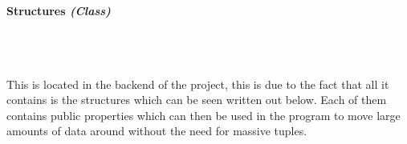 \begin{FlushLeft}
    \begin{figure}[H]
        \centering
    \end{figure}\\

    \bk

    \paragraph{Structures \textit{(Class)}} \mbox{} \\

    \begin{figure}[H]
        \centering
    \end{figure}\\

    This is located in the backend of the project, this is due to the fact that all it contains is the structures which can be seen written out below. Each of them contains public properties which can then be used in the program to move large amounts of data around without the need for massive tuples.


\end{FlushLeft}
